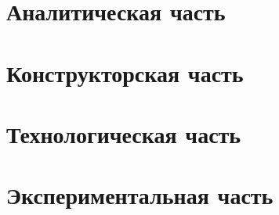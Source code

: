 \documentclass[12pt, a4paper]{report} %
\begin{document}


\tableofcontents



\chapter{Аналитическая часть}


\chapter{Конструкторская часть}


\chapter{Технологическая часть}


\chapter{Экспериментальная часть}





\end{document}
